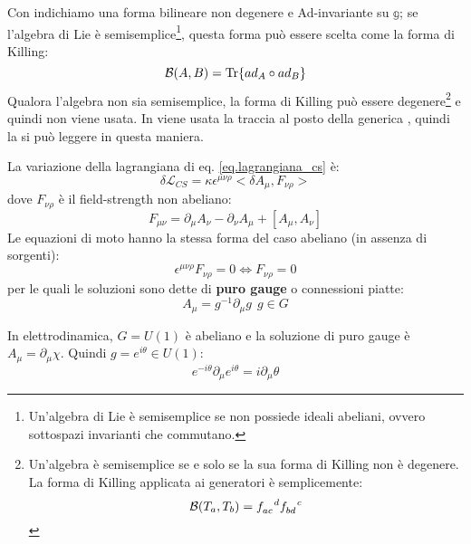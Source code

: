 Con \virgolette{$<\cdot>$} indichiamo una forma bilineare non degenere e Ad-invariante su $\mathbb{g}$; se l'algebra di Lie è semisemplice\footnote{Un'algebra di Lie è semisemplice se non possiede ideali abeliani, ovvero sottospazi invarianti che commutano.}, questa forma può essere scelta come la forma di Killing:
\begin{equation}
    \mathcal B(A,B) = \Tr{ad_A \circ ad_B}
\end{equation}
Qualora l'algebra non sia semisemplice, la forma di Killing può essere degenere\footnote{Un'algebra è semisemplice se e solo se la sua forma di Killing non è degenere. La forma di Killing applicata ai generatori è semplicemente:
\begin{equation*}
    \mathcal B(T_a, T_b) = \tensor{f}{_{ac}^d}\tensor{f}{_{bd}^c}
\end{equation*}
} e quindi non viene usata. In \cite{chernsimons} viene usata la traccia al posto della generica \virgolette{$<\cdot>$}, quindi la si può leggere in questa maniera.

La variazione della lagrangiana di eq. \ref{eq.lagrangiana_cs} è:
\begin{equation*}
    \delta \mathcal L_{CS} = \kappa \epsilon^{\mu\nu\rho} < \delta A_\mu, F_{\nu\rho}>
\end{equation*}
dove $F_{\nu\rho}$ è il field-strength non abeliano:
\begin{equation}
    F_{\mu\nu} = \partial_\mu A_\nu - \partial_\nu A_\mu + [A_\mu, A_\nu]
    \label{eq.field_strength}
\end{equation}
Le equazioni di moto hanno la stessa forma del caso abeliano (in assenza di sorgenti):
\begin{equation*}
    \epsilon^{\mu\nu\rho}F_{\nu\rho} = 0 \iff F_{\nu\rho} = 0
\end{equation*}
per le quali le soluzioni sono dette di \textbf{puro gauge} o connessioni piatte:
\begin{equation}
    A_\mu = g^{-1}\partial_\mu g \ \ g \in G
    \label{eq.puro_gauge}
\end{equation}
\begin{esempio}
In elettrodinamica, $G=U(1)$ è abeliano e la soluzione di puro gauge è $A_\mu = \partial_\mu \chi$. Quindi $g= e^{i\theta} \in U(1)$:
\begin{equation*}
    e^{-i\theta}\partial_\mu e^{i\theta} = i\partial_\mu\theta
\end{equation*}
\end{esempio}

